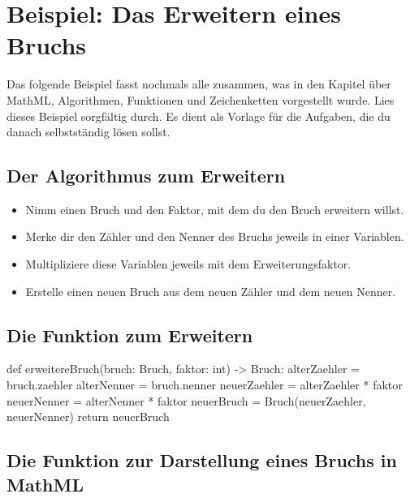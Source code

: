 \section{Beispiel: Das Erweitern eines Bruchs}

Das folgende Beispiel fasst nochmals alle zusammen, was in den Kapitel über MathML, Algorithmen, Funktionen und Zeichenketten vorgestellt wurde. Lies dieses Beispiel sorgfältig durch. Es dient als Vorlage für die Aufgaben, die du danach selbstständig lösen sollst.

\subsection{Der Algorithmus zum Erweitern}

\begin{itemize}
	\item Nimm einen Bruch und den Faktor, mit dem du den Bruch erweitern willst.
	\item Merke dir den Zähler und den Nenner des Bruchs jeweils in einer Variablen.
	\item Multipliziere diese Variablen jeweils mit dem Erweiterungsfaktor.
	\item Erstelle einen neuen Bruch aus dem neuen Zähler und dem neuen Nenner.
\end{itemize}

\subsection{Die Funktion zum Erweitern}

\begin{codePython}
def erweitereBruch(bruch: Bruch, faktor: int) -> Bruch:
	alterZaehler = bruch.zaehler
	alterNenner = bruch.nenner
	neuerZaehler = alterZaehler * faktor
	neuerNenner = alterNenner * faktor
	neuerBruch = Bruch(neuerZaehler, neuerNenner)
	return neuerBruch
\end{codePython}

\subsection{Die Funktion zur Darstellung eines Bruchs in MathML}

